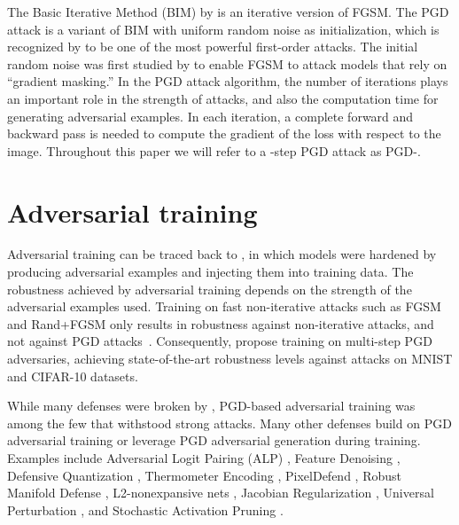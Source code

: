 \documentclass{article}
\begin{document}
The Basic Iterative Method (BIM) by \cite{kurakin2016adversarialBIM} is an iterative version of FGSM. 
The PGD attack is a variant of BIM with uniform random noise as initialization, which is recognized by \cite{athalye2018obfuscated} to be one of the most powerful first-order attacks.
The initial random noise was first studied by \cite{tramer2017ensemble} to enable FGSM to attack models that rely on ``gradient masking.'' 
In the PGD attack algorithm,
the number of iterations  plays an important role in the strength of attacks, and also the computation time for generating adversarial examples. 
In each iteration, a complete forward and backward pass is needed to compute the gradient of the loss with respect to the image.
Throughout this paper we will refer to a -step PGD attack as PGD-.



\section{Adversarial training}
Adversarial training can be traced back to \citep{goodfellow2014explaining}, in which models were hardened by producing adversarial examples and injecting them into training data. 
The robustness achieved by adversarial training depends on the strength of the adversarial examples used. 
Training on fast non-iterative attacks such as FGSM and Rand+FGSM only results in robustness against non-iterative attacks, and not against PGD attacks~\citep{kurakin2016adversarial,madry2017towards}. Consequently, \cite{madry2017towards} propose training on multi-step PGD adversaries, achieving state-of-the-art robustness levels against  attacks on MNIST and CIFAR-10 datasets. 

While many defenses were broken by \cite{athalye2018obfuscated}, PGD-based adversarial training was among the few that withstood strong attacks. Many other defenses build on PGD adversarial training or leverage PGD adversarial generation during training. Examples include Adversarial Logit Pairing (ALP) \citep{kannan2018adversarial}, Feature Denoising \citep{xie2018feature}, Defensive Quantization \citep{lin2018defensive}, Thermometer Encoding \citep{buckman2018thermometer}, PixelDefend \citep{song2017pixeldefend}, Robust Manifold Defense \citep{ilyas2017robust}, L2-nonexpansive nets \citep{qian2018l2}, Jacobian Regularization \citep{jakubovitz2018improving},
Universal Perturbation \citep{shafahi2018universal}, 
and Stochastic Activation Pruning \citep{dhillon2018stochastic}. 
\end{document}
